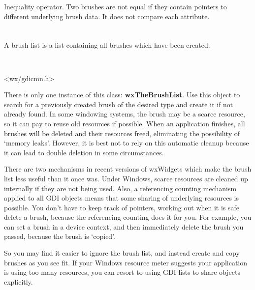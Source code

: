 \label{wxbrushnotequals}


Inequality operator. Two brushes are not equal if they contain pointers
to different underlying brush data. It does not compare each attribute.

\section{}\label{wxbrushlist}

A brush list is a list containing all brushes which have been created.


\\


<wx/gdicmn.h>


There is only one instance of this class: {\bf wxTheBrushList}.  Use
this object to search for a previously created brush of the desired
type and create it if not already found. In some windowing systems,
the brush may be a scarce resource, so it can pay to reuse old
resources if possible. When an application finishes, all brushes will
be deleted and their resources freed, eliminating the possibility of
`memory leaks'. However, it is best not to rely on this automatic
cleanup because it can lead to double deletion in some circumstances.

There are two mechanisms in recent versions of wxWidgets which make the
brush list less useful than it once was. Under Windows, scarce resources
are cleaned up internally if they are not being used. Also, a referencing
counting mechanism applied to all GDI objects means that some sharing
of underlying resources is possible. You don't have to keep track of pointers,
working out when it is safe delete a brush, because the referencing counting does
it for you. For example, you can set a brush in a device context, and then
immediately delete the brush you passed, because the brush is `copied'.

So you may find it easier to ignore the brush list, and instead create
and copy brushes as you see fit. If your Windows resource meter suggests
your application is using too many resources, you can resort to using
GDI lists to share objects explicitly.

